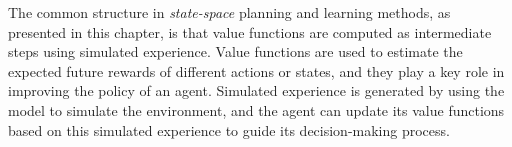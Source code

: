 \documentclass[../chapters.tex]{subfiles}
\begin{document}
    The common structure in \emph{state-space} planning and learning methods, as presented in this chapter, is that value functions are computed as intermediate steps using simulated experience.
    Value functions are used to estimate the expected future rewards of different actions or states, and they play a key role in improving the policy of an agent.
    Simulated experience is generated by using the model to simulate the environment, and the agent can update its value functions based on this simulated experience to guide its decision-making process.
%
    \begin{center}
    \end{center}
\end{document}
